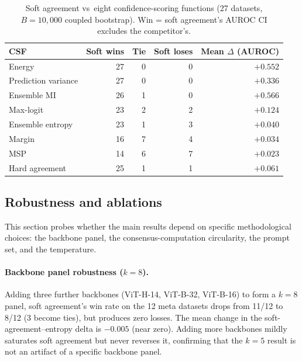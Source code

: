 \documentclass[a4paper,fleqn]{cas-sc}
\begin{document}
\begin{table}[t]
\centering
\caption{Soft agreement vs~eight confidence-scoring functions (27 datasets, $B{=}10{,}000$ coupled bootstrap). Win = soft agreement's AUROC CI excludes the competitor's.}
\label{tab:sota_csf}
\small
\begin{tabular}{lrrrr}
\toprule
CSF & Soft wins & Tie & Soft loses & Mean $\Delta$ (AUROC) \\
\midrule
Energy~\citep{liu2020energy}              & 27 & 0 & 0 & $+0.552$ \\
Prediction variance                       & 27 & 0 & 0 & $+0.336$ \\
Ensemble MI~\citep{smith2018understanding}& 26 & 1 & 0 & $+0.566$ \\
Max-logit~\citep{hendrycks2022scaling}   & 23 & 2 & 2 & $+0.124$ \\
Ensemble entropy                           & 23 & 1 & 3 & $+0.040$ \\
Margin                                     & 16 & 7 & 4 & $+0.034$ \\
MSP~\citep{hendrycks2017baseline}         & 14 & 6 & 7 & $+0.023$ \\
\midrule
Hard agreement                             & 25 & 1 & 1 & $+0.061$ \\
\bottomrule
\end{tabular}
\end{table}

\subsection{Robustness and ablations}
\label{sec:ablations}

This section probes whether the main results depend on specific methodological choices: the backbone panel, the consensus-computation circularity, the prompt set, and the temperature.

\paragraph{Backbone panel robustness ($k{=}8$).}
Adding three further backbones (ViT-H-14, ViT-B-32, ViT-B-16) to form a $k{=}8$ panel, soft agreement's win rate on the 12 meta datasets drops from 11/12 to 8/12 (3 become ties), but produces zero losses.
The mean change in the soft-agreement--entropy delta is $-0.005$ (near zero).
Adding more backbones mildly saturates soft agreement but never reverses it, confirming that the $k{=}5$ result is not an artifact of a specific backbone panel.
\end{document}
